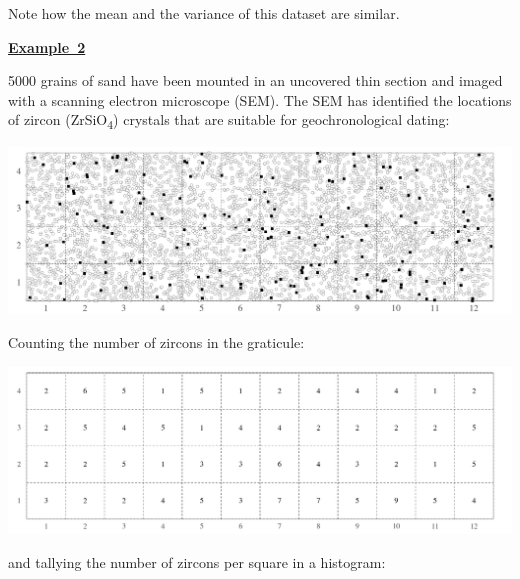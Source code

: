 Note how the mean and the variance of this dataset are similar.\medskip

\noindent\textbf{\underline{Example~2}}\medskip

5000 grains of sand have been mounted in an uncovered thin section and
imaged with a scanning electron microscope (SEM). The SEM has
identified the locations of zircon (ZrSiO\textsubscript{4}) crystals
that are suitable for geochronological dating:

\noindent\includegraphics[]{../figures/zircons.pdf}
\begingroup {}
\label{fig:zircons}
\endgroup

Counting the number of zircons in the graticule:

\noindent\includegraphics[]{../figures/zirconcounts.pdf}
\begingroup {}
\label{fig:zirconcounts}\endgroup

\noindent and tallying the number of zircons per square in a histogram:

